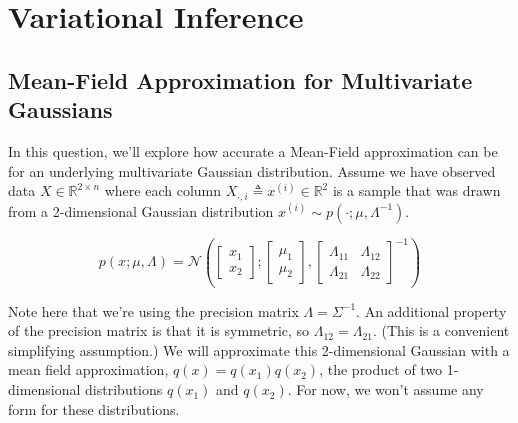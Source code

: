 \documentclass[a3paper,12pt]{extarticle} %
\begin{document}
\newpage
\section{Variational Inference}
\subsection{Mean-Field Approximation for Multivariate Gaussians}
In this question, we’ll explore how accurate a Mean-Field approximation can be for an underlying multivariate Gaussian distribution. Assume we have observed data \( X \in \mathbb{R}^{2 \times n} \) where each column \( X_{\cdot,i} \triangleq x^{(i)} \in \mathbb{R}^2 \) is a sample that was drawn from a 2-dimensional Gaussian distribution \( x^{(i)} \sim p(\cdot; \mu, \Lambda^{-1}) \).

\[
p(x; \mu, \Lambda) = \mathcal{N} \left( 
\begin{bmatrix}
x_1 \\
x_2
\end{bmatrix}
;
\begin{bmatrix}
\mu_1 \\
\mu_2
\end{bmatrix}
,
\begin{bmatrix}
\Lambda_{11} & \Lambda_{12} \\
\Lambda_{21} & \Lambda_{22}
\end{bmatrix}^{-1}
\right)
\tag{1}
\]

Note here that we’re using the precision matrix \( \Lambda = \Sigma^{-1} \). An additional property of the precision matrix is that it is symmetric, so \( \Lambda_{12} = \Lambda_{21} \). (This is a convenient simplifying assumption.) We will approximate this 2-dimensional Gaussian with a mean field approximation, \( q(x) = q(x_1)q(x_2) \), the product of two 1-dimensional distributions \( q(x_1) \) and \( q(x_2) \). For now, we won’t assume any form for these distributions.
\end{document}
